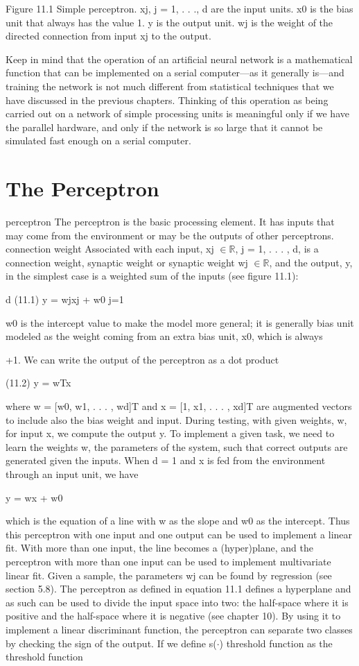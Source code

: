 Figure 11.1 Simple perceptron. xj, j = 1, . . ., d are the input units. x0 is the bias unit that always has the value 1. y is the output unit. wj is the weight of the directed connection from input xj to the output.

Keep in mind that the operation of an artificial neural network is a mathematical function that can be implemented on a serial computer---as it generally is---and training the network is not much different from statistical techniques that we have discussed in the previous chapters. Thinking of this operation as being carried out on a network of simple processing units is meaningful only if we have the parallel hardware, and only if the network is so large that it cannot be simulated fast enough on a serial computer.

\section{The Perceptron}

perceptron The perceptron is the basic processing element. It has inputs that may come from the environment or may be the outputs of other perceptrons. connection weight Associated with each input, xj $\in$$\mathbb{R}$, j = 1, . . . , d, is a connection weight, synaptic weight or synaptic weight wj $\in$$\mathbb{R}$, and the output, y, in the simplest case is a weighted sum of the inputs (see figure 11.1):

d (11.1) y = wjxj + w0 j=1

w0 is the intercept value to make the model more general; it is generally bias unit modeled as the weight coming from an extra bias unit, x0, which is always

+1. We can write the output of the perceptron as a dot product

(11.2) y = wTx

where w = [w0, w1, . . . , wd]T and x = [1, x1, . . . , xd]T are augmented vectors to include also the bias weight and input. During testing, with given weights, w, for input x, we compute the output y. To implement a given task, we need to learn the weights w, the parameters of the system, such that correct outputs are generated given the inputs. When d = 1 and x is fed from the environment through an input unit, we have

y = wx + w0

which is the equation of a line with w as the slope and w0 as the intercept. Thus this perceptron with one input and one output can be used to implement a linear fit. With more than one input, the line becomes a (hyper)plane, and the perceptron with more than one input can be used to implement multivariate linear fit. Given a sample, the parameters wj can be found by regression (see section 5.8). The perceptron as defined in equation 11.1 defines a hyperplane and as such can be used to divide the input space into two: the half-space where it is positive and the half-space where it is negative (see chapter 10). By using it to implement a linear discriminant function, the perceptron can separate two classes by checking the sign of the output. If we define s($\cdot$) threshold function as the threshold function

